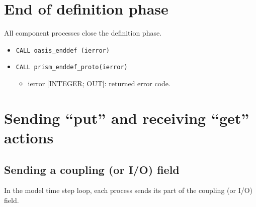 \section{End of definition phase}
\label{subsubsec_Endofdefinition}
All component processes close the definition phase.
\begin{itemize}
\item {\tt CALL oasis\_enddef       (ierror)}
\item {\tt CALL prism\_enddef\_proto(ierror)}
\begin{itemize}
  \item ierror [INTEGER; OUT]: returned error code.
\end{itemize}
\end{itemize}


\section{Sending ``put'' and receiving ``get'' actions}
\label{subsubsec_sendingreceiving}

\subsection{Sending a coupling (or I/O) field}
\label{prismput}

In the model time step loop, each process 
sends its part of the coupling (or I/O) field. 

